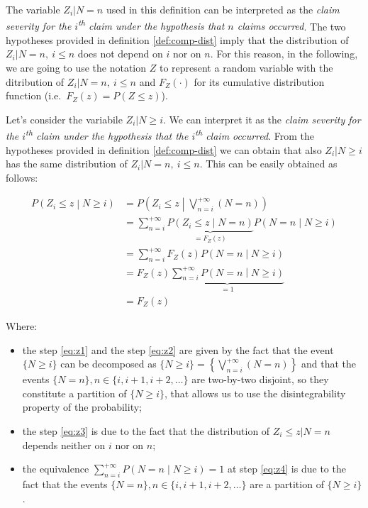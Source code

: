 \documentclass[a4paper, nobind]{templates/ociamthesis}
\providecommand{\tightlist}{%
  \setlength{\itemsep}{0pt}\setlength{\parskip}{0pt}}
\theoremstyle{definition}
\theoremstyle{definition}
\theoremstyle{definition}
\theoremstyle{remark}
\begin{document}
The variable \(Z_i|N=n\) used in this definition can be interpreted as the \emph{claim severity for the \(i\)\textsuperscript{th} claim under the hypothesis that \(n\) claims occurred}. The two hypotheses provided in definition \ref{def:comp-dist} imply that the distribution of \(Z_i|N=n, \ i\le n\) does not depend on \(i\) nor on \(n\). For this reason, in the following, we are going to use the notation \(Z\) to represent a random variable with the ditribution of \(Z_i|N=n, \ i\le n\) and \(F_Z(\cdot)\) for its cumulative distribution function (i.e.~\(F_Z(z) = P(Z\le z)\)).

Let's consider the variabile \(Z_i|N\ge i\). We can interpret it as the \emph{claim severity for the \(i\)\textsuperscript{th} claim under the hypothesis that the \(i\)\textsuperscript{th} claim occurred}. From the hypotheses provided in definition \ref{def:comp-dist} we can obtain that also \(Z_i|N\ge i\) has the same distribution of \(Z_i|N=n, \ i\le n\). This can be easily obtained as follows:

\begin{align}
\label{eq:z1}
P\left(Z_i \le z \middle| N\ge i \right) & = P\left(Z_i \le z \middle| \bigvee_{n = i}^{+\infty}{(N=n)}\right)
\\ \label{eq:z2} & =
\sum_{n=i}^{+\infty}{ \underbrace{P\left(Z_i\le z \middle| N=n\right)}_{=F_Z(z)} P\left( N = n \middle| N\ge i \right)}
\\ \label{eq:z3} & =
\sum_{n=i}^{+\infty}{ F_Z(z) P\left( N = n \middle| N\ge i \right)}
\\ \label{eq:z4} & =
F_Z(z) \underbrace{\sum_{n=i}^{+\infty}{P\left( N = n \middle| N\ge i \right)}}_{=1}
\\ \nonumber & =
F_Z(z)
\end{align}

Where:

\begin{itemize}
\tightlist
\item
  the step \eqref{eq:z1} and the step \eqref{eq:z2} are given by the fact that the event \(\{N\ge i\}\) can be decomposed as \(\{N\ge i\} = \left\{ \bigvee_{n = i}^{+\infty}{(N=n)} \right\}\) and that the events \(\{N=n\}, n\in\{i, i+1, i+2, \dots\}\) are two-by-two disjoint, so they constitute a partition of \(\{N\ge i\}\), that allows us to use the disintegrability property of the probability;
\item
  the step \eqref{eq:z3} is due to the fact that the distribution of \(Z_i\le z | N=n\) depends neither on \(i\) nor on \(n\);
\item
  the equivalence \(\sum_{n=i}^{+\infty}{P\left( N = n \middle| N\ge i \right)} = 1\) at step \eqref{eq:z4} is due to the fact that the events \(\{N=n\}, n\in\{i, i+1, i+2, \dots\}\) are a partition of \(\{N\ge i\}\).
\end{itemize}
\end{document}
